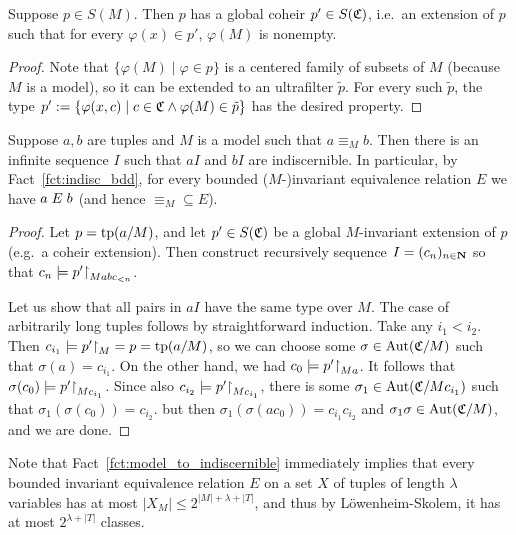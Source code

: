 	\begin{fct}
		\label{fct:model_coheir}
		Suppose $p\in S(M)$. Then $p$ has a global coheir $p'\in S({\mathfrak C})$, i.e.\ an extension of $p$ such that for every $\varphi(x)\in p'$, $\varphi(M)$ is nonempty.
	\end{fct}
	\begin{proof}
		Note that $\{\varphi(M)\mid \varphi\in p \}$ is a centered family of subsets of $M$ (because $M$ is a model), so it can be extended to an ultrafilter $\tilde p$. For every such $\tilde p$, the type $p':=\{\varphi(x,c)\mid c\in {\mathfrak C}\land \varphi(M)\in \tilde p \}$ has the desired property.
	\end{proof}
	
	\begin{fct}
		\label{fct:model_to_indiscernible}
		Suppose $a,b$ are tuples and $M$ is a model such that $a\equiv_M b$. Then there is an infinite sequence $I$ such that $aI$ and $bI$ are indiscernible. In particular, by Fact~\ref{fct:indisc_bdd}, for every bounded ($M$-)invariant equivalence relation $E$ we have $a\mathrel{E} b$ (and hence $\equiv_M\subseteq E$).
	\end{fct}
	\begin{proof}
		Let $p=\operatorname{{tp}}(a/M)$, and let $p'\in S({\mathfrak C})$ be a global $M$-invariant extension of $p$ (e.g.\ a coheir extension). Then construct recursively sequence $I=(c_n)_{n\in {\mathbf{N}}}$ so that $c_n\models p'\mathord{\upharpoonright}_{Mabc_{<n}}$.
		
		Let us show that all pairs in $aI$ have the same type over $M$. The case of arbitrarily long tuples follows by straightforward induction. Take any $i_1<i_2$. Then $c_{i_1}\models p'\mathord{\upharpoonright}_M=p=\operatorname{{tp}}(a/M)$, so we can choose some $\sigma\in \operatorname{{Aut}}({\mathfrak C}/M)$ such that $\sigma(a)=c_{i_1}$. On the other hand, we had $c_{0}\models p'\mathord{\upharpoonright}_{Ma}$. It follows that $\sigma(c_0)\models p'\mathord{\upharpoonright}_{Mc_{i_1}}$. Since also $c_{i_2}\models p'\mathord{\upharpoonright}_{Mc_{i_1}}$, there is some $\sigma_1\in \operatorname{{Aut}}({\mathfrak C}/Mc_{i_1})$ such that $\sigma_1(\sigma(c_0))=c_{i_2}$. but then $\sigma_1(\sigma(ac_0))=c_{i_1}c_{i_2}$ and $\sigma_1\sigma\in\operatorname{{Aut}}({\mathfrak C}/M)$, and we are done.
	\end{proof}
	
	\begin{rem}
		\label{rem:bounded_noofclasses}
		Note that Fact~\ref{fct:model_to_indiscernible} immediately implies that every bounded invariant equivalence relation $E$ on a set $X$ of tuples of length $\lambda$ variables has at most $\lvert X_M\rvert\leq 2^{\lvert M\rvert+\lambda+\lvert T\rvert}$, and thus by Löwenheim-Skolem, it has at most $2^{\lambda+\lvert T\rvert}$ classes.\xqed{\lozenge}
	\end{rem}
	
